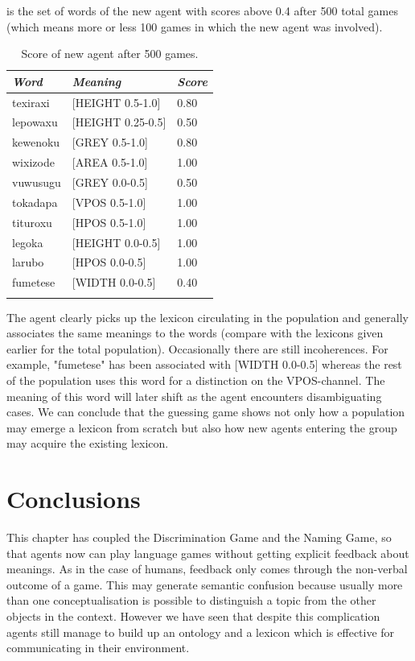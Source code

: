  is the set of words of the new agent
with scores above 0.4 after 
500 total games (which means more or less 100 games 
in which the new agent was involved). 
\begin{table}
\begin{center}
\begin{tabular}{ l  l  l }
\lsptoprule
{\it Word} & {\it Meaning} & {\it Score} \\ \midrule
texiraxi &  [HEIGHT 0.5-1.0] & 0.80 \\ \midrule
lepowaxu &  [HEIGHT 0.25-0.5] & 0.50 \\ \midrule
kewenoku &  [GREY 0.5-1.0] & 0.80 \\ \midrule
wixizode & [AREA 0.5-1.0] & 1.00 \\ \midrule
vuwusugu & [GREY 0.0-0.5] & 0.50 \\ \midrule
tokadapa &  [VPOS 0.5-1.0] & 1.00 \\ \midrule
tituroxu &  [HPOS 0.5-1.0] & 1.00 \\ \midrule
legoka   &  [HEIGHT 0.0-0.5] & 1.00 \\ \midrule
larubo   &  [HPOS 0.0-0.5] & 1.00 \\ \midrule
fumetese &  [WIDTH 0.0-0.5] & 0.40 \\ \midrule
\lspbottomrule
\end{tabular}
\caption{\label{tab:newagents} Score of new agent after 500 games.}
\end{center}
\end{table}
The agent clearly picks up the lexicon circulating
in the population and generally associates the 
same meanings to the words (compare with the 
lexicons given earlier for the total population). 
Occasionally there are still incoherences. For example, 
"fumetese" has been associated with [WIDTH 0.0-0.5] 
whereas the rest of the population uses this word
for a distinction on the VPOS-channel. The meaning
of this word will later shift as the agent encounters
disambiguating cases. We can conclude that the 
guessing game shows not only how a population may 
emerge a lexicon from scratch but also how new 
agents entering the group may acquire the existing 
lexicon.  

\section{Conclusions}

This chapter has coupled the Discrimination Game and 
the Naming Game, so that agents now can play language
games without getting explicit feedback about meanings. 
As in the case of humans, feedback only comes through 
the non-verbal outcome of a game. 
This may generate semantic confusion
because usually more than one conceptualisation is 
possible to distinguish a topic from the other objects
in the context. However we have seen that despite
this complication agents still manage to build up 
an ontology and a lexicon which is effective for 
communicating in their environment. 

